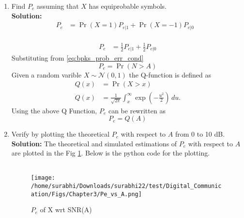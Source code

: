 \documentclass[journal,10pt,twocolumn]{IEEEtran}
\newcounter{Chapcounter}
\numberwithin{equation}{subsection}
\numberwithin{figure}{subsection}
\renewcommand\thesection{\theChapcounter.\arabic{section}}
\providecommand{\pr}[1]{\ensuremath{\Pr\left(#1\right)}}
\newcommand{\solution}{\noindent \textbf{Solution: }}
\providecommand{\gauss}[2]{\mathcal{N}\ensuremath{\left(#1,#2\right)}}
\renewcommand\thesection{\arabic{section}}
\renewcommand\thesubsection{\thesection.\arabic{subsection}}
\begin{document}
\begin{enumerate}[label=\thesubsection.\arabic*,ref=\thesubsection.\arabic{figure}]
 \item Find $P_e$ assuming that $X$ has equiprobable symbols.\\
 \solution \begin{align}
	P_e &= \pr{X=1}P_{e|1} + \pr{X=-1}P_{e|0}& \label{eq:Pe_of_X}
	\end{align}
	\\
	\begin{align}
	P_e &= \frac{1}{2}P_{e|1} + \frac{1}{2}P_{e|0}
\end{align}
Substituting from \eqref{eq:bpks_prob_err_cond}
\begin{equation}
	P_e = \pr{N > A}
\end{equation}
Given a random varible $X \sim \gauss{0}{1}$ the Q-function is defined as
\begin{align}
	Q(x) &= \pr{X > x}\\
	\label{eq:q_func_integral}
	Q(x) &= \frac{1}{\sqrt{2\pi}} \int_x^\infty \exp\left(-\frac{u^2}{2}\right) \, du.
\end{align}
Using the above Q Function, $P_e$ can be rewritten as
\begin{equation}
	P_e = Q(A)
\end{equation} 
\item
Verify by plotting  the theoretical $P_e$ with respect to $A$ from 0 to 10 dB.\\
\solution 
The theoretical and simulated estimations of $P_e$ with respect to $A$ are plotted in the Fig \ref{fig:bpsk1}. Below is the python code for the plotting. \\

\\	
	
\begin{figure}[!ht]
\centering
\texttt{[image: /home/surabhi/Downloads/surabhi22/test/Digital\_Communication/Figs/Chapter3/Pe\_vs\_A.png]}   
\caption{$P_e$ of X wrt SNR(A)}
\label{fig:bpsk1}
\end{figure}


\end{enumerate}
\end{document}
